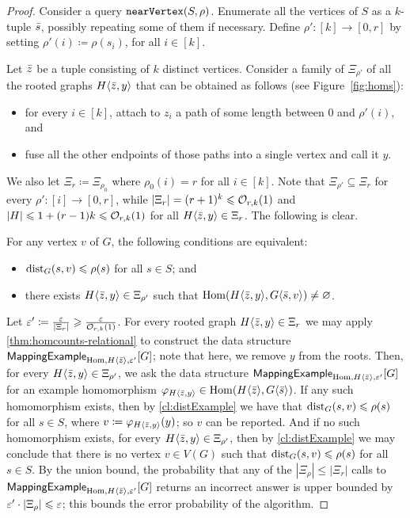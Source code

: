 \begin{proof}
	Consider a query $\mathtt{nearVertex}(S,\rho)$. Enumerate all the vertices of $S$ as a $k$-tuple ${\bar{s}}$, possibly repeating some of them if necessary. Define $\rho'\colon [k]\to [0,r]$ by setting $\rho'(i)\coloneqq \rho(s_i)$, for all $i\in [k]$. 
	
	Let ${\bar{z}}$ be a tuple consisting of $k$ distinct vertices. 
	Consider a family of $\Xi_{\rho'}$ of all the rooted graphs $H\langle {\bar{z}},y\rangle$ that can be obtained as follows (see Figure~\ref{fig:homs}):
	\begin{itemize}
		\item for every $i\in [k]$, attach to $z_i$ a path of some length between $0$ and $\rho'(i)$, and
		\item fuse all the other endpoints of those paths into a single vertex and call it $y$.
	\end{itemize}
	We also let $\Xi_r\coloneqq \Xi_{\rho_0}$ where $\rho_0(i)=r$ for all $i\in [k]$. 
	Note that $\Xi_{\rho'}\subseteq \Xi_r$ for every $\rho'\colon [i]\to [0,r]$, while $|\Xi_r|=(r+1)^{k}\leqslant \mathcal{O}_{r,k}(1)$ and $|H|\leqslant 1+(r-1)k\leqslant \mathcal{O}_{r,k}(1)$ for all $H\langle {\bar{z}},y\rangle\in \Xi_r$.
	The following is clear.
	
	\begin{claim}\label{cl:distExample}
		For any vertex $v$ of $G$, the following conditions are equivalent:
		\begin{itemize}
			\item $\mathrm{dist}_G(s,v)\leqslant \rho(s)$ for all $s\in S$; and
			\item there exists $H\langle {\bar{z}},y\rangle\in \Xi_{\rho'}$ such that $\mathrm{Hom}(H\langle {\bar{z}},y\rangle,G\langle {\bar{s}},v\rangle)\neq\varnothing$.
		\end{itemize}
	\end{claim}

	Let $\varepsilon'\coloneqq \tfrac{\varepsilon}{|\Xi_r|}\geqslant \tfrac{\varepsilon}{\mathcal{O}_{r,k}(1)}$.
	For every rooted graph $H\langle {\bar{z}},y\rangle\in \Xi_{r}$ we may apply \cref{thm:homcounts-relational} to construct the data structure $\mathsf{MappingExample}_{\mathrm{Hom}, H\langle {\bar{z}}\rangle,\varepsilon'}[G]$; note that here, we remove $y$ from the roots.
	Then, for every $H\langle {\bar{z}},y\rangle\in \Xi_{\rho'}$, we ask the data structure $\mathsf{MappingExample}_{\mathrm{Hom}, H\langle {\bar{z}}\rangle,\varepsilon'}[G]$ for an example homomorphism $\varphi_{H\langle {\bar{z}},y\rangle}\in \mathrm{Hom}(H\langle {\bar{z}}\rangle,G\langle {\bar{s}}\rangle)$. If any such homomorphism exists, then by \cref{cl:distExample} we have that $\mathrm{dist}_G(s,v)\leqslant \rho(s)$ for all $s\in S$, where $v\coloneqq \varphi_{H\langle {\bar{z}},y\rangle}(y)$; so $v$ can be reported. And if no such homomorphism exists, for every $H\langle {\bar{z}},y\rangle\in \Xi_{\rho'}$, then by \cref{cl:distExample} we may conclude that there is no vertex $v\in V(G)$ such that $\mathrm{dist}_G(s,v)\leqslant \rho(s)$ for all $s\in S$. By the union bound, the probability that any of the $|\Xi_{\rho}|\leq |\Xi_r|$ calls to  $\mathsf{MappingExample}_{\mathrm{Hom}, H\langle {\bar{z}}\rangle,\varepsilon'}[G]$ returns an incorrect answer is upper bounded by $\varepsilon'\cdot |\Xi_\rho|\leqslant \varepsilon$; this bounds the error probability of the algorithm.


\end{proof}
